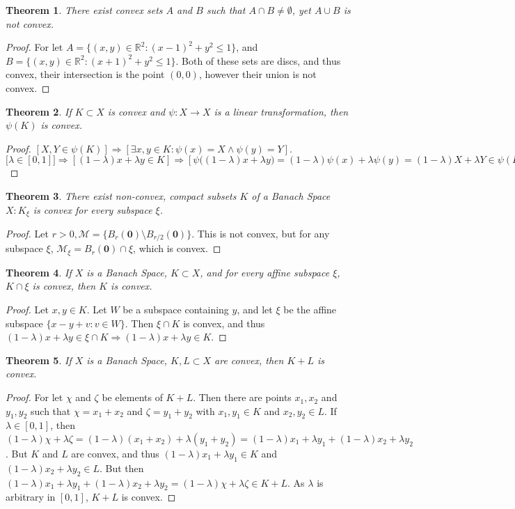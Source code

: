 \documentclass[crop=false,class=book]{standalone}
\theoremstyle{mystyle}
\newtheorem{theorem}{Theorem}[section]
\begin{document}
\begin{theorem}
There exist convex sets $A$ and $B$ such that $A\cap B \ne \emptyset$, yet $A\cup B$ is not convex.
\end{theorem}
\begin{proof}
For let $A = \{(x,y)\in \mathbb{R}^2: (x-1)^2+y^2\leq 1\}$, and $B = \{(x,y)\in \mathbb{R}^2:(x+1)^2+y^2\leq 1\}$. Both of these sets are discs, and thus convex, their intersection is the point $(0,0)$, however their union is not convex.
\end{proof}
\begin{theorem}
If $K\subset X$ is convex and $\psi:X\rightarrow X$ is a linear transformation, then $\psi(K)$ is convex.
\end{theorem}
\begin{proof}
$[X,Y\in \psi(K)]\Rightarrow [\exists x,y\in K:\psi(x)=X\land \psi(y)=Y]$. $\big[\lambda \in [0,1]\big]\Rightarrow [(1-\lambda)x+\lambda y\in K]\Rightarrow [\psi\big((1-\lambda)x+\lambda y\big)=(1-\lambda)\psi(x)+\lambda\psi(y) = (1-\lambda)X+\lambda Y \in \psi(K)]$
\end{proof}
\begin{theorem}
There exist non-convex, compact subsets $K$ of a Banach Space $X: K_{\xi}$ is convex for every subspace $\xi$.
\end{theorem}
\begin{proof}
Let $r>0, \mathcal{M} = \{B_{r}(\mathbf{0})\setminus B_{r/2}(\mathbf{0})\}$. This is not convex, but for any subspace $\xi$, $\mathcal{M}_{\xi} = B_{r}(\mathbf{0})\cap \xi$, which is convex.
\end{proof}
\begin{theorem}
If $X$ is a Banach Space, $K\subset X$, and for every affine subspace $\xi$, $K\cap \xi$ is convex, then $K$ is convex.
\end{theorem}
\begin{proof}
Let $x,y\in K$. Let $W$ be a subspace containing $y$, and let $\xi$ be the affine subspace $\{x-y+v:v\in W\}$. Then $\xi\cap K$ is convex, and thus $(1-\lambda)x+\lambda y \in \xi \cap K \Rightarrow (1-\lambda)x+\lambda y \in K$.
\end{proof}
\begin{theorem}
If $X$ is a Banach Space, $K,L\subset X$ are convex, then $K+L$ is convex.
\end{theorem}
\begin{proof}
For let $\chi$ and $\zeta$ be elements of $K+L$. Then there are points $x_1,x_2$ and $y_1,y_2$ such that $\chi=x_1+x_2$ and $\zeta = y_1+y_2$ with $x_1,y_1\in K$ and $x_2,y_2\in L$. If $\lambda \in [0,1]$, then $(1-\lambda)\chi + \lambda \zeta = (1-\lambda)(x_1+x_2)+\lambda(y_1+y_2) = (1-\lambda)x_1 + \lambda y_1 + (1-\lambda)x_2 + \lambda y_2$. But $K$ and $L$ are convex, and thus $(1-\lambda)x_1 + \lambda y_1 \in K$ and $(1-\lambda)x_2 + \lambda y_2 \in L$. But then $(1-\lambda)x_1 + \lambda y_1 + (1-\lambda)x_2 + \lambda y_2=(1-\lambda)\chi + \lambda \zeta\in K+L$. As $\lambda$ is arbitrary in $[0,1]$, $K+L$ is convex.
\end{proof}
\end{document}
